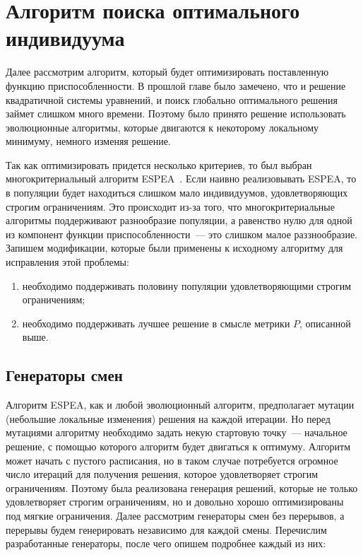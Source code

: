 \documentclass[times,specification,annotation]{itmo-student-thesis}
\begin{document}
\section{Алгоритм поиска оптимального индивидуума} \label{section:used_evolutionary_algorithm_description}

Далее рассмотрим алгоритм, который будет оптимизировать поставленную функцию приспособленности.
В прошлой главе было замечено, что и решение квадратичной системы уравнений, и поиск глобально оптимального решения займет слишком много времени.
Поэтому было принято решение использовать эволюционные алгоритмы, которые двигаются к некоторому локальному минимуму, немного изменяя решение.

Так как оптимизировать придется несколько критериев, то был выбран многокритериальный алгоритм ESPEA~\cite{10.1145/2739480.2754674}.
Если наивно реализовывать ESPEA, то в популяции будет находиться слишком мало индивидуумов, удовлетворяющих строгим ограничениям.
Это происходит из-за того, что многокритериальные алгоритмы поддерживают разнообразие популяции, а равенство нулю для одной из компонент функции приспособленности~--- это слишком малое раззнообразие.
Запишем модификации, которые были применены к исходному алгоритму для исправления этой проблемы:

\begin{enumerate}
    \item необходимо поддерживать половину популяции удовлетворяющими строгим ограничениям;
    \item необходимо поддерживать лучшее решение в смысле метрики $P$, описанной выше.
\end{enumerate}

\subsection{Генераторы смен}

Алгоритм ESPEA, как и любой эволюционный алгоритм, предполагает мутации (небольшие локальные изменения) решения на каждой итерации.
Но перед мутациями алгоритму необходимо задать некую стартовую точку~--- начальное решение, с помощью которого алгоритм будет двигаться к оптимуму.
Алгоритм может начать с пустого расписания, но в таком случае потребуется огромное число итераций для получения решения, которое удовлетворяет строгим ограничениям.
Поэтому была реализована генерация решений, которые не только удовлетворяет строгим ограничениям, но и довольно хорошо оптимизированы под мягкие ограничения.
Далее рассмотрим генераторы смен без перерывов, а перерывы будем генерировать независимо для каждой смены.
Перечислим разработанные генераторы, после чего опишем подробнее каждый из них:
\end{document}
